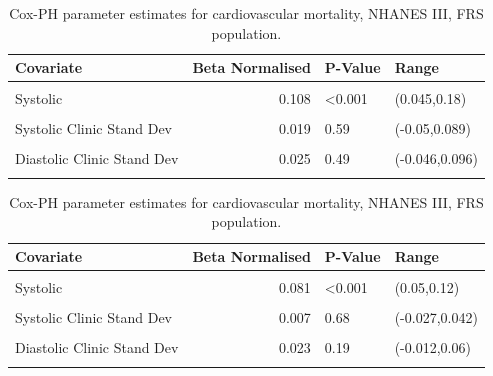 \documentclass[
]{article}
\begin{document}
\begin{table}[!h]
\centering
\caption{\label{tab:freqCVDF}Cox-PH parameter estimates for cardiovascular mortality, NHANES III, FRS population.}
\centering
\begin{tabular}[t]{lrll}
\toprule
Covariate & Beta Normalised & P-Value & Range\\
\midrule
\cellcolor{gray!10}{FRS (1998)} & \cellcolor{gray!10}{0.512} & \cellcolor{gray!10}{<0.001} & \cellcolor{gray!10}{(0.34,0.67)}\\
Systolic & 0.108 & <0.001 & (0.045,0.18)\\
\cellcolor{gray!10}{Diastolic} & \cellcolor{gray!10}{0.102} & \cellcolor{gray!10}{0.0057} & \cellcolor{gray!10}{(0.029,0.18)}\\
Systolic Clinic Stand Dev & 0.019 & 0.59 & (-0.05,0.089)\\
\cellcolor{gray!10}{Systolic Home Stand Dev} & \cellcolor{gray!10}{0.060} & \cellcolor{gray!10}{0.085} & \cellcolor{gray!10}{(-0.0082,0.13)}\\
Diastolic Clinic Stand Dev & 0.025 & 0.49 & (-0.046,0.096)\\
\cellcolor{gray!10}{Diastolic Home Stand Dev} & \cellcolor{gray!10}{0.028} & \cellcolor{gray!10}{0.46} & \cellcolor{gray!10}{(-0.045,0.1)}\\
\bottomrule
\end{tabular}
\end{table}

\begin{table}[!h]
\centering
\caption{\label{tab:freqALLF}Cox-PH parameter estimates for cardiovascular mortality, NHANES III, FRS population.}
\centering
\begin{tabular}[t]{lrll}
\toprule
Covariate & Beta Normalised & P-Value & Range\\
\midrule
\cellcolor{gray!10}{FRS (1998)} & \cellcolor{gray!10}{0.223} & \cellcolor{gray!10}{<0.001} & \cellcolor{gray!10}{(0.14,0.3)}\\
Systolic & 0.081 & <0.001 & (0.05,0.12)\\
\cellcolor{gray!10}{Diastolic} & \cellcolor{gray!10}{0.067} & \cellcolor{gray!10}{<0.001} & \cellcolor{gray!10}{(0.032,0.11)}\\
Systolic Clinic Stand Dev & 0.007 & 0.68 & (-0.027,0.042)\\
\cellcolor{gray!10}{Systolic Home Stand Dev} & \cellcolor{gray!10}{0.017} & \cellcolor{gray!10}{0.35} & \cellcolor{gray!10}{(-0.019,0.054)}\\
Diastolic Clinic Stand Dev & 0.023 & 0.19 & (-0.012,0.06)\\
\cellcolor{gray!10}{Diastolic Home Stand Dev} & \cellcolor{gray!10}{0.012} & \cellcolor{gray!10}{0.54} & \cellcolor{gray!10}{(-0.027,0.05)}\\
\bottomrule
\end{tabular}
\end{table}
\end{document}
